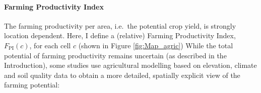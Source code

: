 \paragraph{Farming Productivity Index}
The farming productivity per area, i.e.\ the potential crop yield, is strongly location dependent.
Here, I define a (relative) Farming Productivity Index, $F_\text{PI}(c)$, for each cell $c$ (shown in Figure \ref{fig:Map_agric}) 
While the total potential of farming productivity remains uncertain (as described in the Introduction), some studies use agricultural modelling based on elevation, climate and soil quality data to obtain a more detailed, spatially explicit view of the farming potential:

